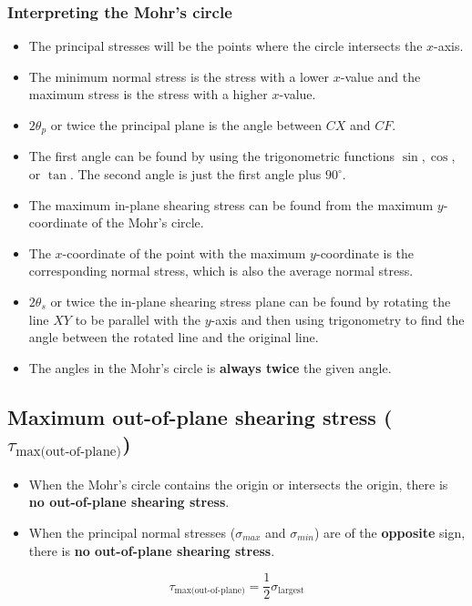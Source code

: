 \documentclass[11pt]{article}
\begin{document}
\subsubsection{Interpreting the Mohr's circle}
\label{sec:org6bb88d3}
\begin{itemize}
\item The principal stresses will be the points where the circle intersects the \(x\)-axis.
\item The minimum normal stress is the stress with a lower \(x\)-value and the maximum stress is the stress with a higher \(x\)-value.
\item \(2\theta_p\) or twice the principal plane is the angle between \(CX\) and \(CF\).
\item The first angle can be found by using the trigonometric functions \(\sin, \cos\), or \(\tan\). The second angle is just the first angle plus \(90^{\circ}\).
\item The maximum in-plane shearing stress can be found from the maximum \(y\)-coordinate of the Mohr's circle.
\item The \(x\)-coordinate of the point with the maximum \(y\)-coordinate is the corresponding normal stress, which is also the average normal stress.
\item \(2 \theta_s\) or twice the in-plane shearing stress plane can be found by rotating the line \(XY\) to be parallel with the \(y\)-axis and then using trigonometry to find the angle between the rotated line and the original line.
\item The angles in the Mohr's circle is \textbf{always twice} the given angle.
\end{itemize}
\subsection{Maximum out-of-plane shearing stress (\(\tau_{\text{max(out-of-plane)}}\))}
\label{sec:org30cb628}
\begin{itemize}
\item When the Mohr's circle contains the origin or intersects the origin, there is \textbf{no out-of-plane shearing stress}.
\item When the principal normal stresses (\(\sigma_{max}\) and \(\sigma_{min}\)) are of the \textbf{opposite} sign, there is \textbf{no out-of-plane shearing stress}.
\end{itemize}

\[\tau_{\text{max(out-of-plane)}} = \frac{1}{2} \sigma_{\text{largest}}\]
\end{document}
